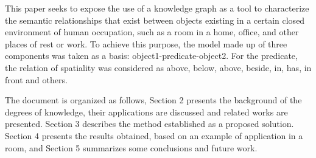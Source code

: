 This paper seeks to expose the use of a knowledge graph as a tool to 
characterize the semantic relationships that exist between objects existing 
in a certain closed environment of human occupation, such as a room in a home, 
office, and other places of rest or work. To achieve this purpose, the model 
made up of three components was taken as a basis: object1-predicate-object2. 
For the predicate, the relation of spatiality was considered as above, below, 
above, beside, in, has, in front and others.

The document is organized as follows, Section 2 presents the background of the 
degrees of knowledge, their applications are discussed and related works are 
presented. Section 3 describes the method established as a proposed solution. 
Section 4 presents the results obtained, based on an example of application in 
a room, and Section 5 summarizes some conclusions and future work.
